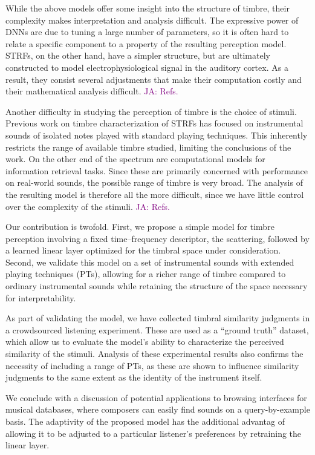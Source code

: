 \documentclass{bmcart}
\newcommand{\ja}[1]{\textcolor{purple}{JA: #1}}
\begin{document}
While the above models offer some insight into the structure of timbre, their complexity makes interpretation and analysis difficult.
The expressive power of DNNs are due to tuning a large number of parameters, so it is often hard to relate a specific component to a property of the resulting perception model.
STRFs, on the other hand, have a simpler structure, but are ultimately constructed to model electrophysiological signal in the auditory cortex.
As a result, they consist several adjustments that make their computation costly and their mathematical analysis difficult.
\ja{Refs.}

Another difficulty in studying the perception of timbre is the choice of stimuli.
Previous work on timbre characterization of STRFs \cite{patil2012music} has focused on instrumental sounds of isolated notes played with standard playing techniques.
This inherently restricts the range of available timbre studied, limiting the conclusions of the work.
On the other end of the spectrum are computational models for information retrieval tasks.
Since these are primarily concerned with performance on real-world sounds, the possible range of timbre is very broad.
The analysis of the resulting model is therefore all the more difficult, since we have little control over the complexity of the stimuli.
\ja{Refs.}

Our contribution is twofold.
First, we propose a simple model for timbre perception involving a fixed time--frequency descriptor, the scattering, followed by a learned linear layer optimized for the timbral space under consideration.
Second, we validate this model on a set of instrumental sounds with extended playing techniques (PTs), allowing for a richer range of timbre compared to ordinary instrumental sounds while retaining the structure of the space necessary for interpretability.

As part of validating the model, we have collected timbral similarity judgments in a crowdsourced listening experiment.
These are used as a ``ground truth'' dataset, which allow us to evaluate the model's ability to characterize the perceived similarity of the stimuli.
Analysis of these experimental results also confirms the necessity of including a range of PTs, as these are shown to influence similarity judgments to the same extent as the identity of the instrument itself.

We conclude with a discussion of potential applications to browsing interfaces for musical databases, where composers can easily find sounds on a query-by-example basis.
The adaptivity of the proposed model has the additional advantag of allowing it to be adjusted to a particular listener's preferences by retraining the linear layer.
\end{document}
